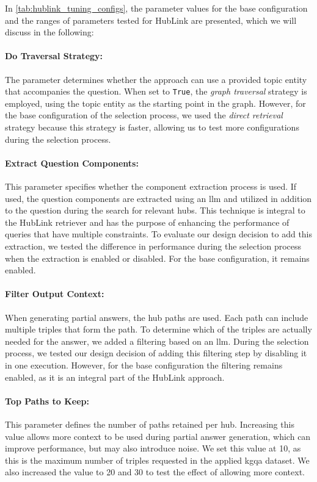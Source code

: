 In \autoref{tab:hublink_tuning_configs}, the parameter values for the base configuration and the ranges of parameters tested for HubLink are presented, which we will discuss in the following:

\paragraph{Do Traversal Strategy:} The parameter determines whether the approach can use a provided topic entity that accompanies the question. When set to \texttt{True}, the \emph{graph traversal} strategy is employed, using the topic entity as the starting point in the graph. However, for the base configuration of the selection process, we used the \emph{direct retrieval} strategy because this strategy is faster, allowing us to test more configurations during the selection process.

\paragraph{Extract Question Components:} This parameter specifies whether the component extraction process is used. If used, the question components are extracted using an \gls{llm} and utilized in addition to the question during the search for relevant hubs. This technique is integral to the HubLink retriever and has the purpose of enhancing the performance of queries that have multiple constraints. To evaluate our design decision to add this extraction, we tested the difference in performance during the selection process when the extraction is enabled or disabled. For the base configuration, it remains enabled.

\paragraph{Filter Output Context:} When generating partial answers, the hub paths are used. Each path can include multiple triples that form the path. To determine which of the triples are actually needed for the answer, we added a filtering based on an \gls{llm}. During the selection process, we tested our design decision of adding this filtering step by disabling it in one execution. However, for the base configuration the filtering remains enabled, as it is an integral part of the HubLink approach.

\paragraph{Top Paths to Keep:} This parameter defines the number of paths retained per hub. Increasing this value allows more context to be used during partial answer generation, which can improve performance, but may also introduce noise. We set this value at 10, as this is the maximum number of triples requested in the applied \gls{kgqa} dataset. We also increased the value to 20 and 30 to test the effect of allowing more context.

